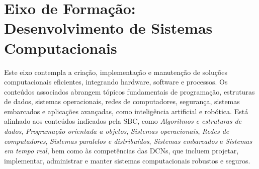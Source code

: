 \section{Eixo de Formação: Desenvolvimento de Sistemas Computacionais}

Este eixo contempla a criação, implementação e manutenção de soluções computacionais eficientes, integrando hardware, software e processos. Os conteúdos associados abrangem tópicos fundamentais de programação, estruturas de dados, sistemas operacionais, redes de computadores, segurança, sistemas embarcados e aplicações avançadas, como inteligência artificial e robótica. Está alinhado aos conteúdos indicados pela SBC, como \textit{Algoritmos e estruturas de dados}, \textit{Programação orientada a objetos}, \textit{Sistemas operacionais}, \textit{Redes de computadores}, \textit{Sistemas paralelos e distribuídos}, \textit{Sistemas embarcados} e \textit{Sistemas em tempo real}, bem como às competências das DCNs, que incluem projetar, implementar, administrar e manter sistemas computacionais robustos e seguros.



